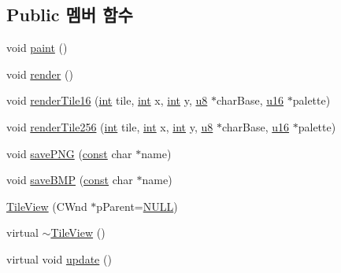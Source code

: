 \subsection*{Public 멤버 함수}
\begin{DoxyCompactItemize}
\item 
void \mbox{\hyperlink{class_tile_view_a4341071a0cab0d5a8b6dfa7318230636}{paint}} ()
\item 
void \mbox{\hyperlink{class_tile_view_a4b8f6e14f8ee7d4abea3a751cb5f7d74}{render}} ()
\item 
void \mbox{\hyperlink{class_tile_view_abc4f9051fc3c2bfad76a6b11787460f8}{render\+Tile16}} (\mbox{\hyperlink{_util_8cpp_a0ef32aa8672df19503a49fab2d0c8071}{int}} tile, \mbox{\hyperlink{_util_8cpp_a0ef32aa8672df19503a49fab2d0c8071}{int}} x, \mbox{\hyperlink{_util_8cpp_a0ef32aa8672df19503a49fab2d0c8071}{int}} y, \mbox{\hyperlink{_system_8h_aed742c436da53c1080638ce6ef7d13de}{u8}} $\ast$char\+Base, \mbox{\hyperlink{_system_8h_a9e6c91d77e24643b888dbd1a1a590054}{u16}} $\ast$palette)
\item 
void \mbox{\hyperlink{class_tile_view_a1232e131b9ef993edea4390809c41814}{render\+Tile256}} (\mbox{\hyperlink{_util_8cpp_a0ef32aa8672df19503a49fab2d0c8071}{int}} tile, \mbox{\hyperlink{_util_8cpp_a0ef32aa8672df19503a49fab2d0c8071}{int}} x, \mbox{\hyperlink{_util_8cpp_a0ef32aa8672df19503a49fab2d0c8071}{int}} y, \mbox{\hyperlink{_system_8h_aed742c436da53c1080638ce6ef7d13de}{u8}} $\ast$char\+Base, \mbox{\hyperlink{_system_8h_a9e6c91d77e24643b888dbd1a1a590054}{u16}} $\ast$palette)
\item 
void \mbox{\hyperlink{class_tile_view_a43f168cd426f0e9215f55c742b6826e7}{save\+P\+NG}} (\mbox{\hyperlink{getopt1_8c_a2c212835823e3c54a8ab6d95c652660e}{const}} char $\ast$name)
\item 
void \mbox{\hyperlink{class_tile_view_aaea86e952981c5622d400ffb57b30480}{save\+B\+MP}} (\mbox{\hyperlink{getopt1_8c_a2c212835823e3c54a8ab6d95c652660e}{const}} char $\ast$name)
\item 
\mbox{\hyperlink{class_tile_view_a870ab4767d06b82a3537dd5aaf7697c1}{Tile\+View}} (C\+Wnd $\ast$p\+Parent=\mbox{\hyperlink{_system_8h_a070d2ce7b6bb7e5c05602aa8c308d0c4}{N\+U\+LL}})
\item 
virtual \mbox{\hyperlink{class_tile_view_a8ecd586e7186c5f85e34aab4fe2a2351}{$\sim$\+Tile\+View}} ()
\item 
virtual void \mbox{\hyperlink{class_tile_view_a09b04d6b0135ef2b6da3c08796c1d354}{update}} ()
\end{DoxyCompactItemize}
